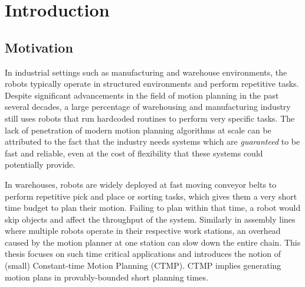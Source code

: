 \documentclass[a4paper]{report}
\begin{document}
\begin{abstract}
\end{abstract}
\newpage

\tableofcontents
\newpage

\chapter{Introduction}
\section{Motivation}
In industrial settings such as manufacturing and warehouse environments, the robots typically operate in structured environments and perform repetitive tasks. Despite significant advancements in the field of motion planning in the past several decades, a large percentage of warehousing and manufacturing industry still uses robots that run hardcoded routines to perform very specific tasks. The lack of penetration of modern motion planning algorithms at scale can be attributed to the fact that the industry needs systems which are \emph{guaranteed} to be fast and reliable, even at the cost of flexibility that these systems could potentially provide.

In warehouses, robots are widely deployed at fast moving conveyor belts to perform repetitive pick and place or sorting tasks, which gives them a very short time budget to plan their motion. Failing to plan within that time, a robot would skip objects and affect the throughput of the system. Similarly in assembly lines where multiple robots operate in their respective work stations, an overhead caused by the motion planner at one station can slow down the entire chain. This thesis focuses on such time critical applications and introduces the notion of (small) Constant-time Motion Planning (CTMP). CTMP implies generating motion plans in provably-bounded short planning times.
\end{document}
